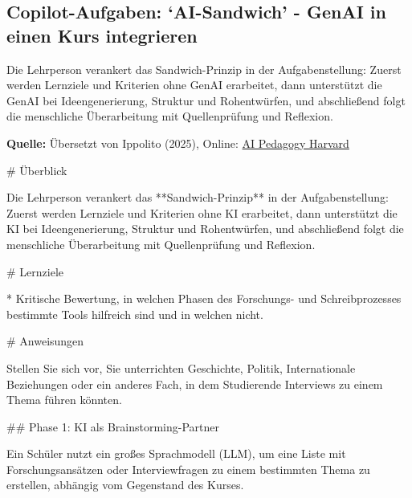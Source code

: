 \documentclass[
  ngerman,
  letterpaper,
  DIV=11]{scrreprt}
\newenvironment{Shaded}{\begin{snugshade}}{\end{snugshade}}
\newcommand{\FunctionTok}[1]{\textcolor[rgb]{0.28,0.35,0.67}{#1}}
\newcommand{\NormalTok}[1]{\textcolor[rgb]{0.00,0.23,0.31}{#1}}
\newcommand{\SpecialStringTok}[1]{\textcolor[rgb]{0.13,0.47,0.30}{#1}}
\begin{document}
\subsection{Copilot-Aufgaben: `AI-Sandwich' - GenAI in einen Kurs
integrieren}\label{sec-prompt-ai-sandwich}

Die Lehrperson verankert das Sandwich-Prinzip in der Aufgabenstellung:
Zuerst werden Lernziele und Kriterien ohne GenAI erarbeitet, dann
unterstützt die GenAI bei Ideengenerierung, Struktur und Rohentwürfen,
und abschließend folgt die menschliche Überarbeitung mit Quellenprüfung
und Reflexion.

\textbf{Quelle:} Übersetzt von Ippolito (2025), Online:
\href{https://aipedagogy.org/assignment/ai-sandwich/}{AI Pedagogy
Harvard}

\begin{tcolorbox}[enhanced jigsaw, left=2mm, bottomrule=.15mm, arc=.35mm, rightrule=.15mm, colframe=quarto-callout-note-color-frame, coltitle=black, colback=white, toprule=.15mm, toptitle=1mm, colbacktitle=quarto-callout-note-color!10!white, title=\textcolor{quarto-callout-note-color}{\faInfo}\hspace{0.5em}{Copilot-Aufgabe: AI-Sandwich}, opacitybacktitle=0.6, leftrule=.75mm, bottomtitle=1mm, titlerule=0mm, opacityback=0, breakable]

\begin{Shaded}
\begin{Highlighting}[]
\FunctionTok{\# Überblick}

\NormalTok{Die Lehrperson verankert das **Sandwich{-}Prinzip** in der Aufgabenstellung: Zuerst werden Lernziele und Kriterien ohne KI erarbeitet, dann unterstützt die KI bei Ideengenerierung, Struktur und Rohentwürfen, und abschließend folgt die menschliche Überarbeitung mit Quellenprüfung und Reflexion.}

\FunctionTok{\# Lernziele}

\SpecialStringTok{* }\NormalTok{Kritische Bewertung, in welchen Phasen des Forschungs{-} und Schreibprozesses bestimmte Tools hilfreich sind und in welchen nicht.}

\FunctionTok{\# Anweisungen}

\NormalTok{Stellen Sie sich vor, Sie unterrichten Geschichte, Politik, Internationale Beziehungen oder ein anderes Fach, in dem Studierende Interviews zu einem Thema führen könnten.}

\FunctionTok{\#\# Phase 1: KI als Brainstorming{-}Partner}

\NormalTok{Ein Schüler nutzt ein großes Sprachmodell (LLM), um eine Liste mit Forschungsansätzen oder Interviewfragen zu einem bestimmten Thema zu erstellen, abhängig vom Gegenstand des Kurses.}


\end{Highlighting}
\end{Shaded}
\end{tcolorbox}
\end{document}
